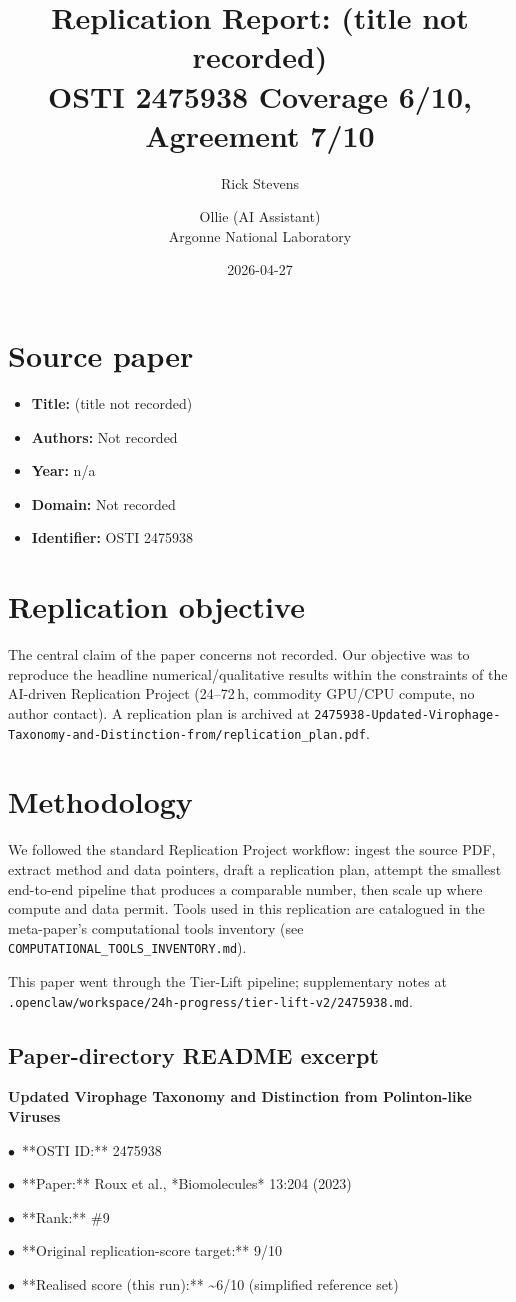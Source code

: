 \documentclass[11pt]{article}
\title{Replication Report: (title not recorded)\\[2pt]\large OSTI 2475938 \textbar{} Coverage 6/10, Agreement 7/10}
\author{Rick Stevens \and Ollie (AI Assistant)\\\small Argonne National Laboratory}
\date{2026-04-27}
\begin{document}
\maketitle

\section{Source paper}
\begin{itemize}
\item \textbf{Title:} (title not recorded)
\item \textbf{Authors:} Not recorded
\item \textbf{Year:} n/a
\item \textbf{Domain:} Not recorded
\item \textbf{Identifier:} OSTI 2475938
\end{itemize}


\section{Replication objective}
The central claim of the paper concerns not recorded. Our objective was to reproduce the headline numerical/qualitative results within the constraints of the AI-driven Replication Project (24--72\,h, commodity GPU/CPU compute, no author contact). A replication plan is archived at \texttt{2475938-Updated-Virophage-Taxonomy-and-Distinction-from/replication\_plan.pdf}.

\section{Methodology}
We followed the standard Replication Project workflow: ingest the source PDF, extract method and data pointers, draft a replication plan, attempt the smallest end-to-end pipeline that produces a comparable number, then scale up where compute and data permit. Tools used in this replication are catalogued in the meta-paper's computational tools inventory (see \texttt{COMPUTATIONAL\_TOOLS\_INVENTORY.md}).

This paper went through the Tier-Lift pipeline; supplementary notes at \texttt{.openclaw/workspace/24h-progress/tier-lift-v2/2475938.md}.

\subsection*{Paper-directory README excerpt}
\small
\par\medskip\textbf{Updated Virophage Taxonomy and Distinction from Polinton-like Viruses}\par
\par$\bullet$\ **OSTI ID:** 2475938
\par$\bullet$\ **Paper:** Roux et al., *Biomolecules* 13:204 (2023)
\par$\bullet$\ **Rank:** \#9
\par$\bullet$\ **Original replication-score target:** 9/10
\par$\bullet$\ **Realised score (this run):** \textasciitilde{}6/10 (simplified reference set)
\end{document}
